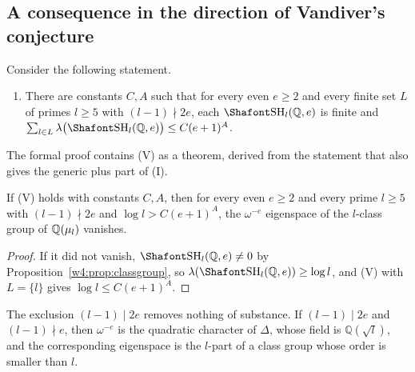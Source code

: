 \subsection{A consequence in the direction of Vandiver's conjecture}\label{tw:sec:vandiver}

Consider the following statement.
\begin{enumerate}
\item[(V)] There are constants $C,A$ such that for every even $e\ge2$ and every finite set $L$ of primes $l\ge5$ with $(l-1)\nmid2e$, each $\Sha_l(\mathbb Q,e)$ is finite and $\sum_{l\in L}\lambda\bigl(\Sha_l(\mathbb Q,e)\bigr)\le C(e+1)^A$.
\end{enumerate}
The formal proof contains (V) as a theorem, derived from the statement that also gives the generic plus part of (I).

\begin{corollary}\label{w4:cor:large}
If (V) holds with constants $C,A$, then for every even $e\ge2$ and every prime $l\ge5$ with $(l-1)\nmid2e$ and $\log l>C(e+1)^A$, the $\omega^{-e}$ eigenspace of the $l$-class group of $\mathbb Q(\mu_l)$ vanishes.
\end{corollary}

\begin{proof}
If it did not vanish, $\Sha_l(\Q,e)\ne0$ by Proposition~\ref{w4:prop:classgroup}, so $\lambda(\Sha_l(\Q,e))\ge\log l$, and (V) with $L=\{l\}$ gives $\log l\le C(e+1)^A$.
\end{proof}

The exclusion $(l-1)\mid2e$ removes nothing of substance. If $(l-1)\mid2e$ and $(l-1)\nmid e$, then $\omega^{-e}$ is the quadratic character of $\Delta$, whose field is $\mathbb Q(\sqrt l)$, and the corresponding eigenspace is the $l$-part of a class group whose order is smaller than $l$.


